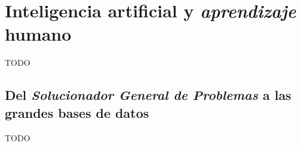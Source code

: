 \section{Inteligencia artificial y \emph{aprendizaje} humano}

TODO

\subsection{Del \emph{Solucionador General de Problemas} a las grandes bases de datos}

TODO
